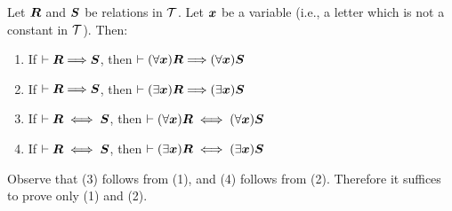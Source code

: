 \begin{dc}\label{c31}%
Let $\boldsymbol{R}$ and $\boldsymbol{S}$ be relations in $\mathcal{T}$.
Let $\boldsymbol{x}$ be a variable (i.e., a letter which is not a
constant in $\mathcal{T}$). Then:
\begin{enumerate}
\item If $\vdash\boldsymbol{R}\Longrightarrow\boldsymbol{S}$, then $\vdash(\forall\boldsymbol{x})\boldsymbol{R}\Longrightarrow(\forall\boldsymbol{x})\boldsymbol{S}$
\item If $\vdash\boldsymbol{R}\Longrightarrow\boldsymbol{S}$, then $\vdash(\exists\boldsymbol{x})\boldsymbol{R}\Longrightarrow(\exists\boldsymbol{x})\boldsymbol{S}$
\item If $\vdash\boldsymbol{R}\iff\boldsymbol{S}$, then $\vdash(\forall\boldsymbol{x})\boldsymbol{R}\iff(\forall\boldsymbol{x})\boldsymbol{S}$
\item If $\vdash\boldsymbol{R}\iff\boldsymbol{S}$, then $\vdash(\exists\boldsymbol{x})\boldsymbol{R}\iff(\exists\boldsymbol{x})\boldsymbol{S}$
\end{enumerate}
\end{dc}
Observe that (3) follows from (1), and (4) follows from (2). Therefore
it suffices to prove only (1) and (2).
